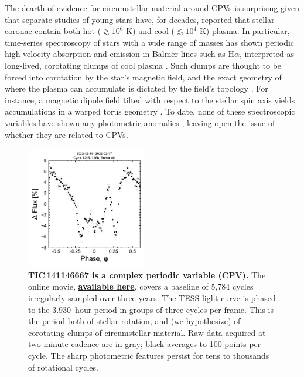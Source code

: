 \documentclass[11pt,twocolumn,tighten]{aastex7}
\newcommand{\periodhr}{3.930}
\begin{document}
The dearth of evidence for circumstellar material around CPVs is
surprising given that separate studies of young stars have, for
decades, reported that stellar coronae contain both hot
($\gtrsim$$10^6$ K) and cool ($\lesssim$$10^4$ K) plasma. In
particular, time-series spectroscopy of stars with a wide range of
masses has shown periodic high-velocity absorption and emission in
Balmer lines such as H$\alpha$, interpreted as long-lived, corotating
clumps of cool plasma
\citep{CollierCameron1989,CollierCameron1992,Barnes2000,Donati2000,Dunstone2006,Skelly2008,Leitzinger2016,Cang2021}.
Such clumps are thought to be forced into corotation by the star's
magnetic field, and the exact geometry of where the plasma can
accumulate is dictated by the field's topology \citep{Waugh2022}.  For
instance, a magnetic dipole field tilted with respect to the stellar
spin axis yields accumulations in a warped torus geometry
\citep{Townsend2005}.  To date, none of these spectroscopic variables
have shown any photometric anomalies \citep{Bouma2024}, leaving open
the issue of whether they are related to CPVs.

\begin{figure}[!t]
  \centering
  \includegraphics[width=0.47\textwidth]{f1.pdf}
  \vspace{-0.4cm}
  \captionsetup{labelformat=moviefmt,labelsep=colon}
	\caption{\textbf{TIC\,141146667 is a complex periodic variable (CPV).}  The
online movie,
  \href{https://lgbouma.com/movies/TIC141146667_20250116.mp4}{{\bf
  available here}},
  covers a baseline of 5{,}784 cycles irregularly sampled over three
  years.  The TESS light curve is phased to the \periodhr\ hour period
  in groups of three cycles per frame.  This is the period both of
  stellar rotation, and (we hypothesize) of corotating clumps of
  circumstellar material.  Raw data acquired at two minute cadence
  are in gray; black averages to 100 points per cycle.  
  The sharp photometric features persist
  for tens to thousands of rotational cycles. }
  \label{fig:lc}
\end{figure}
\end{document}
